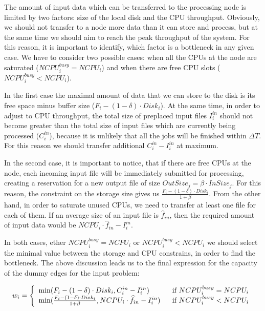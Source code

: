 \documentclass{svjour3}                     %
\begin{document}
The amount of input data which can be transferred to the processing node is limited by two factors: size of the local disk and the CPU throughput. Obviously, we should not transfer to a node more data than it can store and process, but at the same time we should aim to reach the peak throughput of the system. For this reason, it is important to identify, which factor is a bottleneck in any given case. We have to consider two possible cases: when all the CPUs at the node are saturated ($NCPU_{i}^{busy} = NCPU_{i}$) and when there are free CPU slots ($NCPU_{i}^{busy} < NCPU_{i}$). 

In the first case the maximal amount of data that we can store to the disk is its free space minus buffer size ($F_{i} -  (1 - \delta) \cdot Disk_{i}$). At the same time, in order to adjust to CPU throughput, the total size of preplaced input files $I_{i}^{in}$ should not become greater than the total size of input files which are currently being processed ($C_{i}^{in}$), because it is unlikely that all the jobs will be finished within $\Delta T$. For this reason we should transfer additional $C_{i}^{in} - I_{i}^{in} $ at maximum.

In the second case, it is important to notice, that if there are free CPUs at the node, each incoming input file will be immediately submitted for processing, creating a reservation for a new output file of size  $OutSize_{j} = \beta \cdot InSize_{j}$. For this reason, the constraint on the storage size gives us $\frac{F_{i} -   (1 - \delta) \cdot Disk_{i}}{1 + \beta}$. From the other hand, in order to saturate unused CPUs, we need to transfer at least one file for each of them. If an average size of an input file is $\widehat{f}_{in}$, then the required amount of input data would be $NCPU_{i} \cdot \widehat{f}_{in} - I_{i}^{in}$. 

In both cases, ether $NCPU_{i}^{busy} = NCPU_{i}$ or $NCPU_{i}^{busy} < NCPU_{i}$ we should select the minimal value between the storage and CPU constrains, in order to find the bottleneck. The above discussion leads us to the final expression for the capacity of the dummy edges for the input problem:

\begin{equation}
w_{i} =\left\{ 
\begin{array}{l l}
\min(F_{i} -  (1 - \delta) \cdot Disk_{i} , 
C_{i}^{in} - I_{i}^{in}) & \ \ \text{if }  NCPU_{i}^{busy} = NCPU_{i} \\
\min(\frac{F_{i} -   (1 - \delta) \cdot Disk_{i}}{1 + \beta},
NCPU_{i} \cdot \widehat{f}_{in} - I_{i}^{in}) & \ \ \text{if }  NCPU_{i}^{busy} < NCPU_{i}

 \end{array} \right.
\label{w}
\end{equation}
\end{document}
